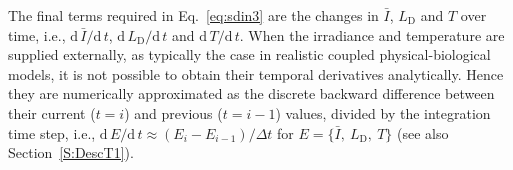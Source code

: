 \documentclass[gmd, manuscript]{copernicus}
\begin{document}


The final terms required in Eq.~\eqref{eq:sdin3} are the changes in $\bar{I}$, $L_{\text{D}}$ and $T$ over time, i.e., $\text{d}\,\bar{I} / \text{d}\,t$, $\text{d}\,L_{\text{D}} / \text{d}\,t$
and $\text{d}\,T / \text{d}\,t$.
When the irradiance and temperature are supplied externally, as typically the case in realistic coupled physical-biological models, it is not possible to obtain their temporal derivatives analytically.  Hence they are numerically approximated as the discrete backward difference between their current ($t=i$) and previous ($t=i-1$) values, divided by the integration time step, i.e., $\text{d}\, E / \text{d}\, t \approx (E_{i} - E_{i-1}) / \Delta t$ for $E=\{\bar{I},\ L_{\text{D}},\ T\}$ (see also Section~\ref{S:DescT1}).
\end{document}
